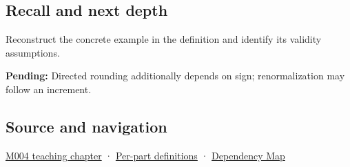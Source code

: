 \subsection{Recall and next depth}\label{appendix-b572b631069b-recall-and-next-depth}

Reconstruct the concrete example in the definition and identify its validity assumptions.

\textbf{Pending:} Directed rounding additionally depends on sign; renormalization may follow an increment.

\subsection{Source and navigation}\label{appendix-b572b631069b-source-and-navigation}

\hyperref[01-foundations-i-ch001-a-stretching-ruler-for-real-valued-quantities]{M004 teaching chapter} · \hyperref[appendix-fd090d982a15-m004---parts-61-76]{Per-part definitions} · \hyperref[appendix-4ad47bdd269a]{Dependency Map}
